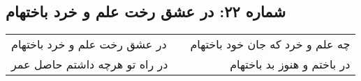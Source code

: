 \begin{center}
\section*{شماره ۲۲: در عشق رخت علم و خرد باختهام}
\label{sec:022}
\begin{longtable}{l p{0.5cm} r}
در عشق رخت علم و خرد باختهام
&&
چه علم و خرد که جان خود باختهام
\\
در راه تو هرچه داشتم حاصل عمر
&&
در باختم و هنوز بد باختهام
\\
\end{longtable}
\end{center}

